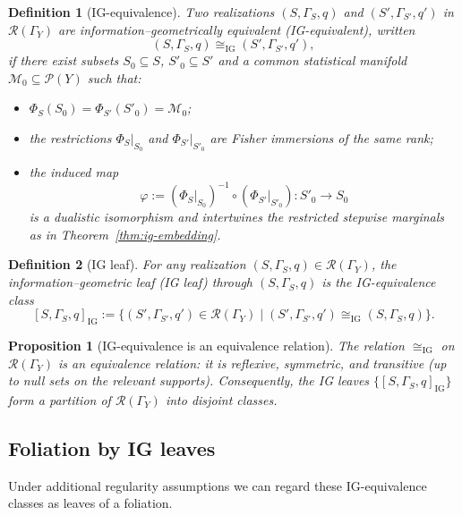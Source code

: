 \documentclass[11pt]{article}
\newtheorem{definition}{Definition}
\newtheorem{proposition}{Proposition}
\newcommand{\Rcal}{\mathcal{R}}
\newcommand{\Pcal}{\mathcal{P}}
\newcommand{\Mcal}{\mathcal{M}}
\begin{document}
\begin{definition}[IG-equivalence]
\label{def:ig-equivalence}
Two realizations $(S,\Gamma_S,q)$ and $(S',\Gamma_{S'},q')$ in
$\Rcal(\Gamma_Y)$ are \emph{information--geometrically equivalent}
(IG-equivalent), written
\[
  (S,\Gamma_S,q) \cong_{\mathrm{IG}} (S',\Gamma_{S'},q'),
\]
if there exist subsets $S_0\subseteq S$, $S'_0\subseteq S'$ and a common
statistical manifold $\Mcal_0\subseteq \Pcal(Y)$ such that:
\begin{itemize}[leftmargin=1.6em]
  \item $\Phi_S(S_0) = \Phi_{S'}(S'_0) = \Mcal_0$;
  \item the restrictions
  $\Phi_S|_{S_0}$ and $\Phi_{S'}|_{S'_0}$ are Fisher immersions of the
  same rank;
  \item the induced map
  \[
    \varphi
    := (\Phi_S|_{S_0})^{-1}\circ(\Phi_{S'}|_{S'_0})
    : S'_0 \to S_0
  \]
  is a dualistic isomorphism and intertwines the restricted stepwise
  marginals as in Theorem~\ref{thm:ig-embedding}.
\end{itemize}
\end{definition}

\begin{definition}[IG leaf]
\label{def:ig-leaf}
For any realization $(S,\Gamma_S,q)\in\Rcal(\Gamma_Y)$, the
\emph{information--geometric leaf} (IG leaf) through $(S,\Gamma_S,q)$ is
the IG-equivalence class
\[
  [S,\Gamma_S,q]_{\mathrm{IG}}
  :=
  \bigl\{
    (S',\Gamma_{S'},q')\in\Rcal(\Gamma_Y)
    \;\big|\;
    (S',\Gamma_{S'},q')\cong_{\mathrm{IG}}(S,\Gamma_S,q)
  \bigr\}.
\]
\end{definition}

\begin{proposition}[IG-equivalence is an equivalence relation]
\label{prop:ig-equivalence-relation}
The relation $\cong_{\mathrm{IG}}$ on $\Rcal(\Gamma_Y)$ is an equivalence
relation: it is reflexive, symmetric, and transitive (up to null sets on
the relevant supports). Consequently, the IG leaves
$\{[S,\Gamma_S,q]_{\mathrm{IG}}\}$ form a partition of $\Rcal(\Gamma_Y)$
into disjoint classes.
\end{proposition}



\subsection{Foliation by IG leaves}

Under additional regularity assumptions we can regard these
IG-equivalence classes as leaves of a foliation.
\end{document}
